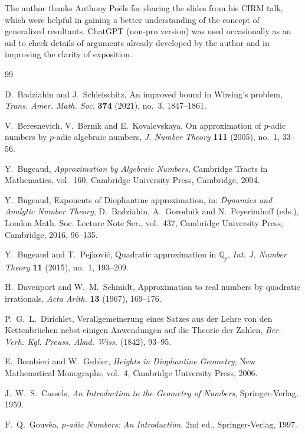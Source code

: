 \documentclass[12pt,reqno]{amsart}
\theoremstyle{definition}
\theoremstyle{remark}
\newcommand{\Qp}{\mathbb Q_p}
\begin{document}
The author thanks Anthony Po\"els for sharing the slides from his CIRM talk,
which were helpful in gaining a better understanding of the concept of generalized resultants. ChatGPT (non-pro version) 
was used occasionally as an aid to check details of arguments already developed by the author and in improving the clarity of exposition.

\bigskip

\begin{thebibliography}{99}

D.~Badziahin and J.~Schleischitz,
An improved bound in Wirsing's problem,
\emph{Trans. Amer. Math. Soc.} \textbf{374} (2021), no.~3, 1847--1861.

V.~Beresnevich, V.~Bernik and E.~Kovalevskaya,
On approximation of $p$-adic numbers by $p$-adic algebraic numbers,
\emph{J. Number Theory} \textbf{111} (2005), no.~1, 33--56.

Y.~Bugeaud,
\emph{Approximation by Algebraic Numbers},
Cambridge Tracts in Mathematics, vol.~160,
Cambridge University Press, Cambridge, 2004.

Y.~Bugeaud,
Exponents of Diophantine approximation,
in: \emph{Dynamics and Analytic Number Theory},
D.~Badziahin, A.~Gorodnik and N.~Peyerimhoff (eds.),
London Math. Soc. Lecture Note Ser., vol.~437,
Cambridge University Press, Cambridge, 2016, 96--135.

Y.~Bugeaud and T.~Pejkovi\'c,
Quadratic approximation in $\Qp$,
\emph{Int. J. Number Theory} \textbf{11} (2015), no.~1, 193--209.

H.~Davenport and W.~M.~Schmidt,
Approximation to real numbers by quadratic irrationals,
\emph{Acta Arith.} \textbf{13} (1967), 169--176.

P.~G.~L.~Dirichlet,
Verallgemeinerung eines Satzes aus der Lehre von den Kettenbr\"uchen nebst
einigen Anwendungen auf die Theorie der Zahlen,
\emph{Ber. Verh. Kgl. Preuss. Akad. Wiss.} (1842), 93--95.

E.~Bombieri and W.~Gubler,
\emph{Heights in Diophantine Geometry},
New Mathematical Monographs, vol.~4,
Cambridge University Press, 2006.

J.~W.~S.~Cassels,
\emph{An Introduction to the Geometry of Numbers},
Springer-Verlag, 1959.

F.~Q.~Gouv\^ea,
\emph{$p$-adic Numbers: An Introduction},
2nd ed., Springer-Verlag, 1997.


\end{thebibliography}
\end{document}
